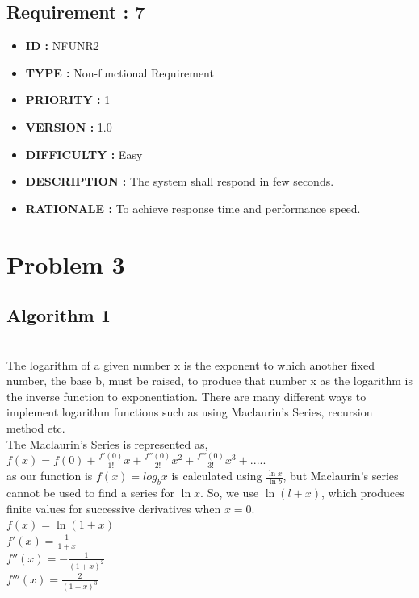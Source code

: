 \documentclass[12pt]{report}
\begin{document}
{\subsection*{Requirement : 7}
     \begin{itemize}
      \item \textbf{ID  : } NFUNR2
      \item \textbf{TYPE  : } Non-functional Requirement
      \item \textbf{PRIORITY  : } 1
      \item \textbf{VERSION  : } 1.0
      \item\textbf{DIFFICULTY  :} Easy
      \item \textbf{DESCRIPTION  : } The system shall respond in few seconds. 
      \item\textbf{RATIONALE  : } To achieve response time and performance speed.
    \end{itemize}  
\section{Problem 3}

\subsection{Algorithm 1 }\\
\newline
\noindent The logarithm of a given number x is the exponent to which another fixed number, the base b, must be raised, to produce that number x as the logarithm is the inverse function to exponentiation. There are many different ways to implement logarithm functions such as using Maclaurin's Series, recursion method etc. \\
The Maclaurin's Series is represented as,\\

$f(x)= f(0) +\frac{f'(0)}{1!} x +\frac{f''(0)}{2!} x^2+\frac{f'''(0)}{3!} x^3+ .....$\\

\noindent
as our function is $f(x) = log_b x$ is calculated using $\frac{\ln x}{\ln b}$, but Maclaurin's series cannot be used to find a series for $\ln x$. So, we use $\ln (l + x)$, which produces finite values for successive derivatives when $x = 0$. \\
\noindent
\newline
$f(x) = \ln (1+x)$       \\ 
$f'(x) =  \frac{1}{1+x}$\\
$f''(x) = -\frac{1}{(1+x)^2}$\\
$f'''(x) = \frac{2}{(1+x)^3}$\\

}
\end{document}
